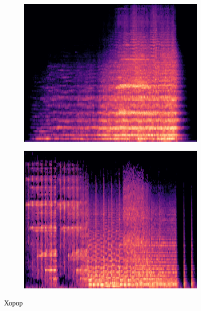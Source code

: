 \documentclass{article}
\begin{document}
\begin{figure}[htbp]
  \centering
  \begin{subfigure}{0.45\textwidth}
    \centering
    \includegraphics[width=\linewidth]{slike/horror30.png} %
    \caption{}
    \label{fig:slika9}
  \end{subfigure}
  \hfill
  \begin{subfigure}{0.45\textwidth}
    \centering
    \includegraphics[width=\linewidth]{slike/horror31.png} %
    \caption{}
    \label{fig:slika10}
  \end{subfigure}
  \caption{Хорор}
  \label{fig:zajednicki_naslov6}
\end{figure}
\end{document}
